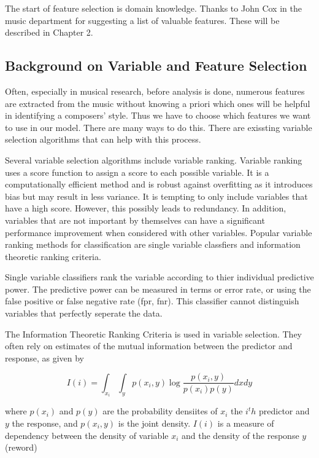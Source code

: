 \documentclass[12pt,twoside]{reedthesis}
\theoremstyle{definition}
\theoremstyle{definition}
\theoremstyle{definition}
\theoremstyle{remark}
\begin{document}
The start of feature selection is domain knowledge. Thanks to John Cox
in the music department for suggesting a list of valuable features.
These will be described in Chapter 2.

\subsection{Background on Variable and Feature
Selection}\label{background-on-variable-and-feature-selection}

Often, especially in musical research, before analysis is done, numerous
features are extracted from the music without knowing a priori which
ones will be helpful in identifying a composers' style. Thus we have to
choose which features we want to use in our model. There are many ways
to do this. There are exissting variable selection algorithms that can
help with this process.

Several variable selection algorithms include variable ranking. Variable
ranking uses a score function to assign a score to each possible
variable. It is a computationally efficient method and is robust against
overfitting as it introduces bias but may result in less variance. It is
tempting to only include variables that have a high score. However, this
possibly leads to redundancy. In addition, variables that are not
important by themselves can have a significant performance improvement
when considered with other variables. Popular variable ranking methods
for classification are single variable classfiers and information
theoretic ranking criteria.

Single variable classifiers rank the variable according to thier
individual predictive power. The predictive power can be measured in
terms or error rate, or using the false positive or false negative rate
(fpr, fnr). This classifier cannot distinguish variables that perfectly
seperate the data.

The Information Theoretic Ranking Criteria is used in variable
selection. They often rely on estimates of the mutual information
between the predictor and response, as given by

\[ I(i) = \int_{x_i}\int_yp(x_i,y)\log\frac{p(x_i,y)}{p(x_i)p(y)}dxdy\]

where \(p(x_i)\) and \(p(y)\) are the probability densiites of \(x_i\)
the \(i^th\) predictor and \(y\) the response, and \(p(x_i,y)\) is the
joint density. \(I(i)\) is a measure of dependency between the density
of variable \(x_i\) and the density of the response \(y\) (reword)
\end{document}
